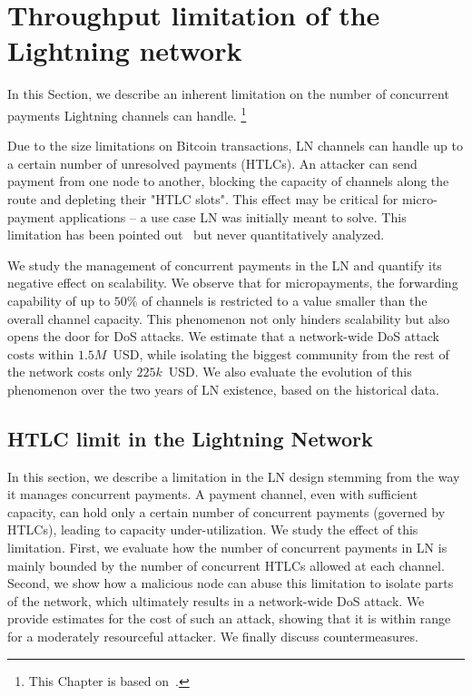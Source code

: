 \chapter{Throughput limitation of the Lightning network}

\label{Chapter08HTLClimit}

In this Section, we describe an inherent limitation on the number of concurrent payments Lightning channels can handle.
\footnote{This Chapter is based on~\cite{Tikhomirov2020a}.}

Due to the size limitations on Bitcoin transactions, LN channels can handle up to a certain number of unresolved payments (HTLCs).
An attacker can send payment from one node to another, blocking the capacity of channels along the route and depleting their "HTLC slots".
This effect may be critical for micro-payment applications -- a use case LN was initially meant to solve.
This limitation has been pointed out~\cite{EmelyanenkoK2017} but never quantitatively analyzed. 

We study the management of concurrent payments in the LN and quantify its negative effect on scalability. 
We observe that for micropayments, the forwarding capability of up to $50\%$ of channels is restricted to a value smaller than the overall channel capacity.
This phenomenon not only hinders scalability but also opens the door for DoS attacks.
We estimate that a network-wide DoS attack costs within $1.5M$~USD, while isolating the biggest community from the rest of the network costs only $225k$~USD.
We also evaluate the evolution of this phenomenon over the two years of LN existence, based on the historical data.


\section{HTLC limit in the Lightning Network}
\label{sec:attack}

In this section, we describe a limitation in the LN design 
stemming from the way it manages concurrent payments. 
A payment channel, even with sufficient capacity, can hold only 
a certain number of concurrent payments (governed by HTLCs), leading to capacity under-utilization.
We study the effect of this limitation.
First, we evaluate how the number of concurrent payments in LN 
is mainly bounded by the number of concurrent HTLCs allowed at each channel. 
Second, we show how a malicious node can abuse this 
limitation to isolate parts of the network, 
which ultimately results in a network-wide DoS attack.
We provide estimates for the cost of such an attack, showing that it is within range for a moderately resourceful attacker. 
We finally discuss countermeasures.


